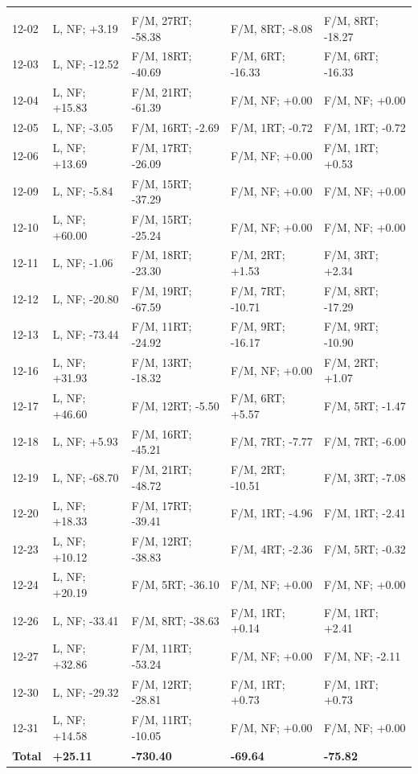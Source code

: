 \begin{table}[H]
\begin{tabular*}{\textwidth}{@{\extracolsep{\fill}} lllll}
\addlinespace[0.25em]
\midrule
\multicolumn{5}{@{}l}{\textbf{December 2024}}\\
12-02 & L, NF; +3.19 & F/M, 27RT; -58.38 & F/M, 8RT; -8.08 & F/M, 8RT; -18.27 \\
12-03 & L, NF; -12.52 & F/M, 18RT; -40.69 & F/M, 6RT; -16.33 & F/M, 6RT; -16.33 \\
12-04 & L, NF; +15.83 & F/M, 21RT; -61.39 & F/M, NF; +0.00 & F/M, NF; +0.00 \\
12-05 & L, NF; -3.05 & F/M, 16RT; -2.69 & F/M, 1RT; -0.72 & F/M, 1RT; -0.72 \\
12-06 & L, NF; +13.69 & F/M, 17RT; -26.09 & F/M, NF; +0.00 & F/M, 1RT; +0.53 \\
12-09 & L, NF; -5.84 & F/M, 15RT; -37.29 & F/M, NF; +0.00 & F/M, NF; +0.00 \\
12-10 & L, NF; +60.00 & F/M, 15RT; -25.24 & F/M, NF; +0.00 & F/M, NF; +0.00 \\
12-11 & L, NF; -1.06 & F/M, 18RT; -23.30 & F/M, 2RT; +1.53 & F/M, 3RT; +2.34 \\
12-12 & L, NF; -20.80 & F/M, 19RT; -67.59 & F/M, 7RT; -10.71 & F/M, 8RT; -17.29 \\
12-13 & L, NF; -73.44 & F/M, 11RT; -24.92 & F/M, 9RT; -16.17 & F/M, 9RT; -10.90 \\
12-16 & L, NF; +31.93 & F/M, 13RT; -18.32 & F/M, NF; +0.00 & F/M, 2RT; +1.07 \\
12-17 & L, NF; +46.60 & F/M, 12RT; -5.50 & F/M, 6RT; +5.57 & F/M, 5RT; -1.47 \\
12-18 & L, NF; +5.93 & F/M, 16RT; -45.21 & F/M, 7RT; -7.77 & F/M, 7RT; -6.00 \\
12-19 & L, NF; -68.70 & F/M, 21RT; -48.72 & F/M, 2RT; -10.51 & F/M, 3RT; -7.08 \\
12-20 & L, NF; +18.33 & F/M, 17RT; -39.41 & F/M, 1RT; -4.96 & F/M, 1RT; -2.41 \\
12-23 & L, NF; +10.12 & F/M, 12RT; -38.83 & F/M, 4RT; -2.36 & F/M, 5RT; -0.32 \\
12-24 & L, NF; +20.19 & F/M, 5RT; -36.10 & F/M, NF; +0.00 & F/M, NF; +0.00 \\
12-26 & L, NF; -33.41 & F/M, 8RT; -38.63 & F/M, 1RT; +0.14 & F/M, 1RT; +2.41 \\
12-27 & L, NF; +32.86 & F/M, 11RT; -53.24 & F/M, NF; +0.00 & F/M, NF; -2.11 \\
12-30 & L, NF; -29.32 & F/M, 12RT; -28.81 & F/M, 1RT; +0.73 & F/M, 1RT; +0.73 \\
12-31 & L, NF; +14.58 & F/M, 11RT; -10.05 & F/M, NF; +0.00 & F/M, NF; +0.00 \\
\textbf{Total} & \textbf{+25.11} & \textbf{-730.40} & \textbf{-69.64} & \textbf{-75.82} \\


\end{tabular*}
\end{table}

